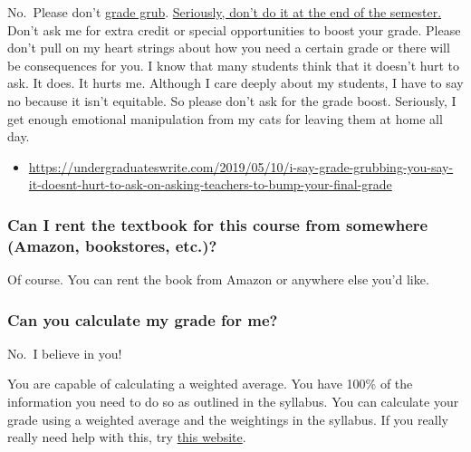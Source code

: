 No.~Please don't \href{https://undergraduateswrite.com/2019/05/10/i-say-grade-grubbing-you-say-it-doesnt-hurt-to-ask-on-asking-teachers-to-bump-your-final-grade/}{grade grub}. \href{https://undergraduateswrite.com/2019/05/10/i-say-grade-grubbing-you-say-it-doesnt-hurt-to-ask-on-asking-teachers-to-bump-your-final-grade/}{Seriously, don't do it at the end of the semester.} Don't ask me for extra credit or special opportunities to boost your grade. Please don't pull on my heart strings about how you need a certain grade or there will be consequences for you. I know that many students think that it doesn't hurt to ask. It does. It hurts me. Although I care deeply about my students, I have to say no because it isn't equitable. So please don't ask for the grade boost. Seriously, I get enough emotional manipulation from my cats for leaving them at home all day.

\begin{itemize}
\tightlist
\item
  \url{https://undergraduateswrite.com/2019/05/10/i-say-grade-grubbing-you-say-it-doesnt-hurt-to-ask-on-asking-teachers-to-bump-your-final-grade}
\end{itemize}

\hypertarget{can-i-rent-the-textbook-for-this-course-from-somewhere-amazon-bookstores-etc.}{%
\subsubsection{Can I rent the textbook for this course from somewhere (Amazon, bookstores, etc.)?}\label{can-i-rent-the-textbook-for-this-course-from-somewhere-amazon-bookstores-etc.}}

Of course. You can rent the book from Amazon or anywhere else you'd like.

\hypertarget{can-you-calculate-my-grade-for-me}{%
\subsubsection{Can you calculate my grade for me?}\label{can-you-calculate-my-grade-for-me}}

No.~I believe in you!

You are capable of calculating a weighted average.
You have 100\% of the information you need to do so as outlined in the syllabus.
You can calculate your grade using a weighted average and the weightings in the syllabus.
If you really really need help with this, try \href{https://thegradecalculator.com/}{this website}.

